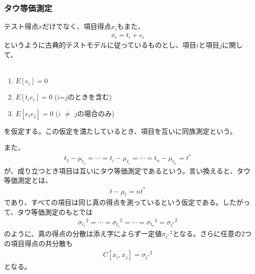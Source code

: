 \documentclass{jarticle}
\begin{document}
\subsubsection{タウ等価測定}
テスト得点$\displaystyle x$だけでなく、項目得点$\displaystyle x_{i}$もまた、
\begin{eqnarray}
  \displaystyle x_{i} = t_{i}+e_{i}
\end{eqnarray}
というように古典的テストモデルに従っているものとし、項目$i$と項目$j$に関して、\\
\\
\begin{enumerate}
  \item  $E[e_{i}] = 0$
  \item  $E[t_{i}e_{i}] = 0$ ($i$=$j$のときを含む)
  \item  $E[e_{i}e_{j}] = 0$ ($i$ $\neq$ $j$の場合のみ)
\end{enumerate}
を仮定する。この仮定を満たしているとき、項目を互いに同族測定という。

また、
\begin{eqnarray}
  \displaystyle t_{1}-\mu_{t_{1}}=\cdots=t_{i}-\mu_{t_{i}}=\cdots=t_{n}-\mu_{t_{n}}=t^{\ast}
\end{eqnarray}
が、成り立つとき項目は互いにタウ等価測定であるという。言い換えると、タウ等価測定とは、
\begin{eqnarray}
  \displaystyle t-\mu_{t}=nt^{\ast}
\end{eqnarray}
であり、すべての項目は同じ真の得点を測っているという仮定である。したがって、タウ等価測定のもとでは
\begin{eqnarray}
  \displaystyle {\sigma_{t_{1}}}^2=\cdots={\sigma_{t_{i}}}^2=\cdots={\sigma_{t_{n}}}^2={\sigma_{t^\ast}}^2
\end{eqnarray}
のように、真の得点の分散は添え字によらず一定値$\displaystyle  {\sigma_{t^\ast}}^2$となる。さらに任意の$2$つの項目得点の共分散も
\begin{eqnarray}
  \displaystyle C[x_{i},x_{j}]={\sigma_{t^\ast}}^2
\end{eqnarray}
となる。
\end{document}

